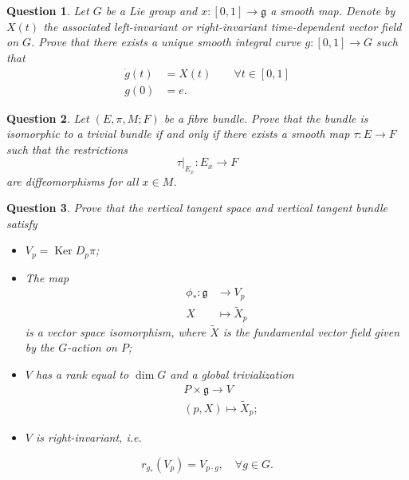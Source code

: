 \theoremstyle{plain}\newtheorem{exercise}{Question}
\nosectionnumbers

\begin{exercise}
    Let $G$ be a Lie group and $x:[0,1] \rightarrow \mathfrak{g}$ a smooth map. Denote by $X(t)$ the associated left-invariant or right-invariant time-dependent vector field on $G$. Prove that there exists a unique smooth integral curve $g:[0,1] \rightarrow G$ such that
    \begin{align*}
    \dot{g}(t) & =X(t) \qquad \forall t \in[0,1] \\
    g(0) & =e.
    \end{align*}
\end{exercise}

\begin{exercise}
    Let $(E, \pi, M ; F)$ be a fibre bundle. Prove that the bundle is isomorphic to a trivial bundle if and only if there exists a smooth map $\tau: E \rightarrow F$ such that the restrictions
    $$\tau|_{E_{x}}: E_{x} \longrightarrow F$$
    are diffeomorphisms for all $x \in M$.
\end{exercise}

\begin{exercise}
    Prove that the vertical tangent space and vertical tangent bundle satisfy
    \begin{itemize}
    \item $V_{p}=\operatorname{Ker} D_{p} \pi$;
    \item The map
    \begin{align*}
    \phi_{*}: \mathfrak{g} & \longrightarrow V_{p} \\
    X & \longmapsto \tilde{X}_{p}
    \end{align*}
    is a vector space isomorphism, where $\tilde{X}$ is the fundamental vector field given by the $G$-action on $P$;
    \item $V$ has a rank equal to $\operatorname{dim} G$ and a global trivialization
    \begin{align*}
    & P \times \mathfrak{g} \longrightarrow V \\
    & (p, X) \longmapsto \tilde{X}_{p} ;
    \end{align*}
    \item $V$ is right-invariant, i.e.
    \end{itemize}
    $$r_{g_{*}}\left(V_{p}\right)=V_{p \cdot g}, \quad \forall g \in G.$$
\end{exercise}

